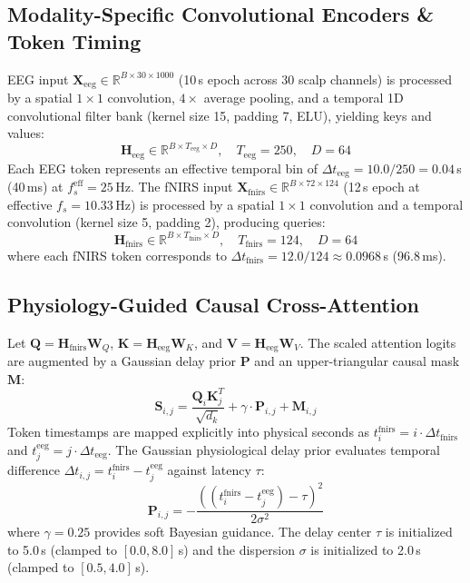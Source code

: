 \documentclass[journal]{IEEEtran}
\begin{document}
\subsection{Modality-Specific Convolutional Encoders \& Token Timing}
EEG input $\mathbf{X}_{\text{eeg}} \in \mathbb{R}^{B \times 30 \times 1000}$ (10\,s epoch across 30 scalp channels) is processed by a spatial $1 \times 1$ convolution, $4\times$ average pooling, and a temporal 1D convolutional filter bank (kernel size 15, padding 7, ELU), yielding keys and values:
\begin{equation}
\mathbf{H}_{\text{eeg}} \in \mathbb{R}^{B \times T_{\text{eeg}} \times D}, \quad T_{\text{eeg}} = 250, \quad D = 64
\end{equation}
Each EEG token represents an effective temporal bin of $\Delta t_{\text{eeg}} = 10.0 / 250 = 0.04$\,s (40\,ms) at $f_s^{\text{eff}} = 25$\,Hz. The fNIRS input $\mathbf{X}_{\text{fnirs}} \in \mathbb{R}^{B \times 72 \times 124}$ (12\,s epoch at effective $f_s = 10.33$\,Hz) is processed by a spatial $1 \times 1$ convolution and a temporal convolution (kernel size 5, padding 2), producing queries:
\begin{equation}
\mathbf{H}_{\text{fnirs}} \in \mathbb{R}^{B \times T_{\text{fnirs}} \times D}, \quad T_{\text{fnirs}} = 124, \quad D = 64
\end{equation}
where each fNIRS token corresponds to $\Delta t_{\text{fnirs}} = 12.0 / 124 \approx 0.0968$\,s (96.8\,ms).

\subsection{Physiology-Guided Causal Cross-Attention}
Let $\mathbf{Q} = \mathbf{H}_{\text{fnirs}} \mathbf{W}_Q$, $\mathbf{K} = \mathbf{H}_{\text{eeg}} \mathbf{W}_K$, and $\mathbf{V} = \mathbf{H}_{\text{eeg}} \mathbf{W}_V$. The scaled attention logits are augmented by a Gaussian delay prior $\mathbf{P}$ and an upper-triangular causal mask $\mathbf{M}$:
\begin{equation}
\mathbf{S}_{i,j} = \frac{\mathbf{Q}_i \mathbf{K}_j^T}{\sqrt{d_k}} + \gamma \cdot \mathbf{P}_{i,j} + \mathbf{M}_{i,j}
\end{equation}
Token timestamps are mapped explicitly into physical seconds as $t_i^{\text{fnirs}} = i \cdot \Delta t_{\text{fnirs}}$ and $t_j^{\text{eeg}} = j \cdot \Delta t_{\text{eeg}}$. The Gaussian physiological delay prior evaluates temporal difference $\Delta t_{i,j} = t_i^{\text{fnirs}} - t_j^{\text{eeg}}$ against latency $\tau$:
\begin{equation}
\mathbf{P}_{i,j} = -\frac{\left( (t_i^{\text{fnirs}} - t_j^{\text{eeg}}) - \tau \right)^2}{2 \sigma^2}
\end{equation}
where $\gamma = 0.25$ provides soft Bayesian guidance. The delay center $\tau$ is initialized to 5.0\,s (clamped to $[0.0, 8.0]$\,s) and the dispersion $\sigma$ is initialized to 2.0\,s (clamped to $[0.5, 4.0]$\,s).
\end{document}
